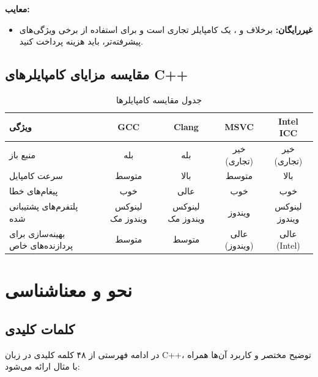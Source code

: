 \documentclass[12pt, a4paper]{report}
\begin{document}
\textbf{معایب:}
\begin{itemize}
	\item \textbf{غیررایگان:} برخلاف  و ،  یک کامپایلر تجاری است و برای استفاده از برخی ویژگی‌های پیشرفته‌تر، باید هزینه پرداخت کنید.
\end{itemize}

\section{مقایسه مزایای کامپایلرهای C++}
\begin{table}[h!]
	\centering
	\begin{tabular}{|l|c|c|c|c|}
		\hline
		\textbf{ویژگی} & \textbf{GCC} & \textbf{Clang} & \textbf{MSVC} & \textbf{Intel ICC} \\ \hline
		منبع باز & بله & بله & خیر (تجاری) & خیر (تجاری) \\ \hline
		سرعت کامپایل & متوسط & بالا & متوسط & بالا \\ \hline
		پیغام‌های خطا & خوب & عالی & خوب & خوب \\ \hline
		پلتفرم‌های پشتیبانی شده & لینوکس ویندوز مک & لینوکس ویندوز مک & ویندوز & لینوکس ویندوز \\ \hline
		بهینه‌سازی برای پردازنده‌های خاص & متوسط & متوسط & عالی (ویندوز) & عالی (Intel) \\ \hline
	\end{tabular}
	\caption{جدول مقایسه کامپایلرها}
	\label{table:compilers}
\end{table}
\chapter{نحو و معناشناسی}
\section{کلمات کلیدی}
در ادامه فهرستی از ۴۸ کلمه کلیدی در زبان C++، توضیح مختصر و کاربرد آن‌ها همراه با مثال ارائه می‌شود:
\end{document}
